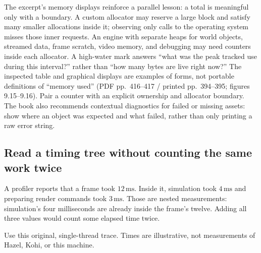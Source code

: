 The excerpt's memory displays reinforce a parallel lesson: a total is meaningful only with a boundary. A custom allocator may reserve a large block and satisfy many smaller allocations inside it; observing only calls to the operating system misses those inner requests. An engine with separate heaps for world objects, streamed data, frame scratch, video memory, and debugging may need counters inside each allocator. A high-water mark answers ``what was the peak tracked use during this interval?'' rather than ``how many bytes are live right now?'' The inspected table and graphical displays are examples of forms, not portable definitions of ``memory used'' (PDF pp.~416--417 / printed pp.~394--395; figures 9.15--9.16). Pair a counter with an explicit ownership and allocator boundary. The book also recommends contextual diagnostics for failed or missing assets: show where an object was expected and what failed, rather than only printing a raw error string.

\subsection{Read a timing tree without counting the same work twice}\label{06-engine-ii-ch041-read-a-timing-tree-without-counting-the-same-work-twice}

\hypertarget{06-engine-ii-ch041-read-a-timing-tree-without-counting-the-same-work-twice}{}

A profiler reports that a frame took \(12\,\mathrm{ms}\). Inside it, simulation took \(4\,\mathrm{ms}\) and preparing render commands took \(3\,\mathrm{ms}\). Those are nested measurements: simulation's four milliseconds are already inside the frame's twelve. Adding all three values would count some elapsed time twice.

Use this original, single-thread trace. Times are illustrative, not measurements of Hazel, Kohi, or this machine.

